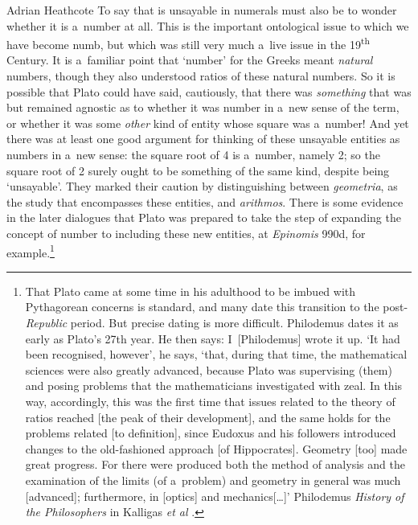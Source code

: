 \begin{artengenv}{Adrian Heathcote}
To say that \sqrtwo is unsayable in numerals must also be to wonder whether it is a~number at all. This is the important ontological issue to which we have become numb, but which was still very much a~live issue in the 19\textsuperscript{th} Century. It is a~familiar point that `number' for the Greeks meant \textit{natural} numbers, though they also understood ratios of these natural numbers. So it is possible that Plato could have said, cautiously, that there was \textit{something} that was \sqrtwo but remained agnostic as to whether it was number in a~new sense of the term, or whether it was some \textit{other} kind of entity whose square was a~number! And yet there was at least one good argument for thinking of these unsayable entities as numbers in a~new sense: the square root of 4 is a~number, namely 2; so the square root of 2 surely ought to be something of the same kind, despite being `unsayable'. They marked their caution by distinguishing between \textit{geometria}, as the study that encompasses these entities, and \textit{arithmos}. There is some evidence in the later dialogues that Plato was prepared to take the step of expanding the concept of number to including these new entities, at  \textit{Epinomis} 990d, for example.\footnote{That Plato came at some time in his adulthood to be imbued with Pythagorean concerns is standard, and many date this transition to the post-\textit{Republic} period. But precise dating is more difficult. Philodemus dates it as early as Plato's 27th year. He then says: I~[Philodemus] wrote it up. ‘It had been recognised, however’, he says, ‘that, during that time, the mathematical sciences were also greatly advanced, because Plato was supervising (them) and posing problems that the mathematicians investigated with zeal. In this way, accordingly, this was the first time that issues related to the theory of ratios reached [the peak of their development], and the same holds for the problems related [to definition], since Eudoxus and his followers introduced changes to the old-fashioned approach [of Hippocrates]. Geometry [too] made great progress. For there were produced both the method of analysis and the examination of the limits (of a~problem) and geometry in general was much [advanced]; furthermore, in [optics] and mechanics[\ldots]' Philodemus \textit{History of the Philosophers} in Kalligas \emph{et al} \parencite*{kalligas_platos_2020}.}


\end{artengenv}
